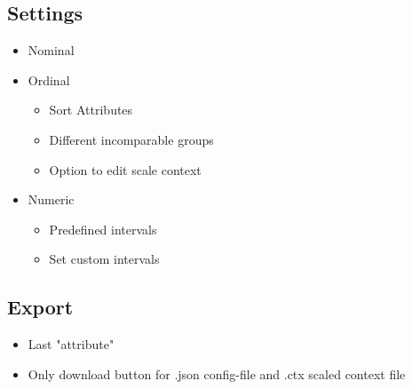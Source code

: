 \documentclass[]{article}
\begin{document}
\subsection{Settings}
\begin{itemize}
	\item Nominal
	\item Ordinal
		\begin{itemize}
			\item Sort Attributes
			\item Different incomparable groups
			\item Option to edit scale context
		\end{itemize}
	\item Numeric
	    \begin{itemize}
	    	\item Predefined intervals
	    	\item Set custom intervals
	    \end{itemize}
\end{itemize}

\subsection{Export}
	\begin{itemize}
		\item Last "attribute"
		\item Only download button for .json config-file and .ctx scaled context file
	\end{itemize}
\end{document}
